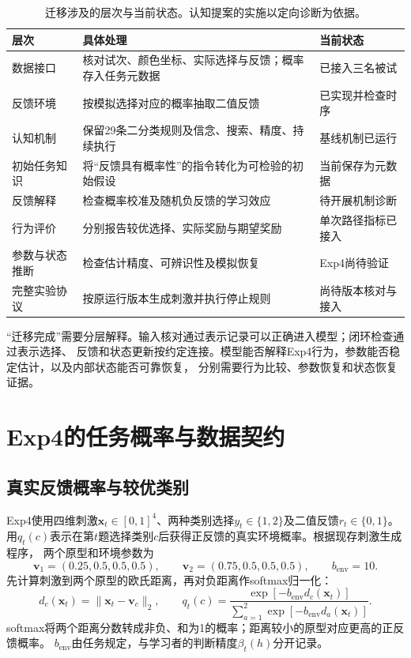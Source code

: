 \documentclass[11pt,a4paper]{article}
\numberwithin{equation}{section}
\begin{document}
\begin{table}[htbp]
\centering\small
\caption{迁移涉及的层次与当前状态。认知提案的实施以定向诊断为依据。}
\begin{tabularx}{\linewidth}{L{2.5cm}Y L{3.5cm}}
\toprule
层次 & 具体处理 & 当前状态\\
\midrule
数据接口 & 核对试次、颜色坐标、实际选择与反馈；概率存入任务元数据 & 已接入三名被试\\
反馈环境 & 按模拟选择对应的概率抽取二值反馈 & 已实现并检查时序\\
认知机制 & 保留29条二分类规则及信念、搜索、精度、持续执行 & 基线机制已运行\\
初始任务知识 & 将“反馈具有概率性”的指令转化为可检验的初始假设 & 当前保存为元数据\\
反馈解释 & 检查概率校准及随机负反馈的学习效应 & 待开展机制诊断\\
行为评价 & 分别报告较优选择、实际奖励与期望奖励 & 单次路径指标已接入\\
参数与状态推断 & 检查估计精度、可辨识性及模拟恢复 & Exp4尚待验证\\
完整实验协议 & 按原运行版本生成刺激并执行停止规则 & 尚待版本核对与接入\\
\bottomrule
\end{tabularx}
\end{table}

“迁移完成”需要分层解释。输入核对通过表示记录可以正确进入模型；闭环检查通过表示选择、
反馈和状态更新按约定连接。模型能否解释Exp4行为，参数能否稳定估计，以及内部状态能否可靠恢复，
分别需要行为比较、参数恢复和状态恢复证据。

\section{Exp4的任务概率与数据契约}
\label{sec:task}

\subsection{真实反馈概率与较优类别}
Exp4使用四维刺激$\bm x_t\in[0,1]^4$、两种类别选择$y_t\in\{1,2\}$及二值反馈$r_t\in\{0,1\}$。
用$q_t(c)$表示在第$t$题选择类别$c$后获得正反馈的真实环境概率。根据现存刺激生成程序，
两个原型和环境参数为
\begin{equation}
\bm v_1=(0.25,0.5,0.5,0.5),\qquad
\bm v_2=(0.75,0.5,0.5,0.5),\qquad b_{\mathrm{env}}=10.
\end{equation}
先计算刺激到两个原型的欧氏距离，再对负距离作softmax归一化：
\begin{equation}
d_c(\bm x_t)=\|\bm x_t-\bm v_c\|_2,\qquad
q_t(c)=\frac{\exp[-b_{\mathrm{env}}d_c(\bm x_t)]}
{\sum_{a=1}^2\exp[-b_{\mathrm{env}}d_a(\bm x_t)]}.
\label{eq:environment-probability}
\end{equation}
softmax将两个距离分数转成非负、和为1的概率；距离较小的原型对应更高的正反馈概率。
$b_{\mathrm{env}}$由任务规定，与学习者的判断精度$\beta_t(h)$分开记录。
\end{document}
